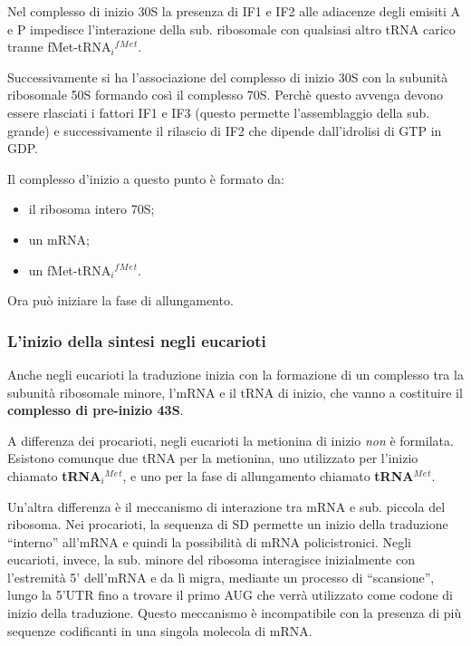 \documentclass[]{article}
\begin{document}
Nel complesso di inizio 30S la presenza di IF1 e IF2 alle adiacenze
degli emisiti A e P impedisce l'interazione della sub. ribosomale con
qualsiasi altro tRNA carico tranne
fMet-tRNA\(_i\)\(^f\)\(^M\)\(^e\)\(^t\).

Successivamente si ha l'associazione del complesso di inizio 30S con la
subunità ribosomale 50S formando così il complesso 70S. Perchè questo
avvenga devono essere rlasciati i fattori IF1 e IF3 (questo permette
l'assemblaggio della sub. grande) e successivamente il rilascio di IF2
che dipende dall'idrolisi di GTP in GDP.

Il complesso d'inizio a questo punto è formato da:

\begin{itemize}
\itemsep1pt\parskip0pt
\item
  il ribosoma intero 70S;
\item
  un mRNA;
\item
  un fMet-tRNA\(_i\)\(^f\)\(^M\)\(^e\)\(^t\).
\end{itemize}

Ora può iniziare la fase di allungamento.

\subsubsection{L'inizio della sintesi negli
eucarioti}\label{linizio-della-sintesi-negli-eucarioti}

Anche negli eucarioti la traduzione inizia con la formazione di un
complesso tra la subunità ribosomale minore, l'mRNA e il tRNA di inizio,
che vanno a costituire il \textbf{complesso di pre-inizio 43S}.

A differenza dei procarioti, negli eucarioti la metionina di inizio
\emph{non} è formilata. Esistono comunque due tRNA per la metionina, uno
utilizzato per l'inizio chiamato \textbf{tRNA\(_i\)\(^M\)\(^e\)\(^t\)},
e uno per la fase di allungamento chiamato
\textbf{tRNA\(^M\)\(^e\)\(^t\)}.

Un'altra differenza è il meccanismo di interazione tra mRNA e sub.
piccola del ribosoma. Nei procarioti, la sequenza di SD permette un
inizio della traduzione ``interno'' all'mRNA e quindi la possibilità di
mRNA policistronici. Negli eucarioti, invece, la sub. minore del
ribosoma interagisce inizialmente con l'estremità 5' dell'mRNA e da lì
migra, mediante un processo di ``scansione'', lungo la 5'UTR fino a
trovare il primo AUG che verrà utilizzato come codone di inizio della
traduzione. Questo meccanismo è incompatibile con la presenza di più
sequenze codificanti in una singola molecola di mRNA.
\end{document}

